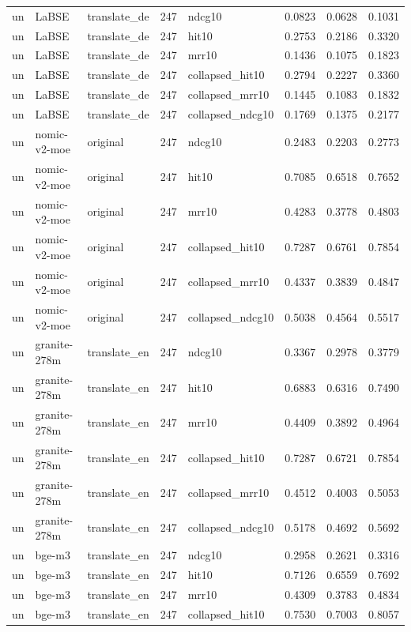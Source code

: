 \begin{tabular}{lllrlrrr}
un & LaBSE & translate\_de & 247 & ndcg10 & 0.0823 & 0.0628 & 0.1031 \\
un & LaBSE & translate\_de & 247 & hit10 & 0.2753 & 0.2186 & 0.3320 \\
un & LaBSE & translate\_de & 247 & mrr10 & 0.1436 & 0.1075 & 0.1823 \\
un & LaBSE & translate\_de & 247 & collapsed\_hit10 & 0.2794 & 0.2227 & 0.3360 \\
un & LaBSE & translate\_de & 247 & collapsed\_mrr10 & 0.1445 & 0.1083 & 0.1832 \\
un & LaBSE & translate\_de & 247 & collapsed\_ndcg10 & 0.1769 & 0.1375 & 0.2177 \\
un & nomic-v2-moe & original & 247 & ndcg10 & 0.2483 & 0.2203 & 0.2773 \\
un & nomic-v2-moe & original & 247 & hit10 & 0.7085 & 0.6518 & 0.7652 \\
un & nomic-v2-moe & original & 247 & mrr10 & 0.4283 & 0.3778 & 0.4803 \\
un & nomic-v2-moe & original & 247 & collapsed\_hit10 & 0.7287 & 0.6761 & 0.7854 \\
un & nomic-v2-moe & original & 247 & collapsed\_mrr10 & 0.4337 & 0.3839 & 0.4847 \\
un & nomic-v2-moe & original & 247 & collapsed\_ndcg10 & 0.5038 & 0.4564 & 0.5517 \\
un & granite-278m & translate\_en & 247 & ndcg10 & 0.3367 & 0.2978 & 0.3779 \\
un & granite-278m & translate\_en & 247 & hit10 & 0.6883 & 0.6316 & 0.7490 \\
un & granite-278m & translate\_en & 247 & mrr10 & 0.4409 & 0.3892 & 0.4964 \\
un & granite-278m & translate\_en & 247 & collapsed\_hit10 & 0.7287 & 0.6721 & 0.7854 \\
un & granite-278m & translate\_en & 247 & collapsed\_mrr10 & 0.4512 & 0.4003 & 0.5053 \\
un & granite-278m & translate\_en & 247 & collapsed\_ndcg10 & 0.5178 & 0.4692 & 0.5692 \\
un & bge-m3 & translate\_en & 247 & ndcg10 & 0.2958 & 0.2621 & 0.3316 \\
un & bge-m3 & translate\_en & 247 & hit10 & 0.7126 & 0.6559 & 0.7692 \\
un & bge-m3 & translate\_en & 247 & mrr10 & 0.4309 & 0.3783 & 0.4834 \\
un & bge-m3 & translate\_en & 247 & collapsed\_hit10 & 0.7530 & 0.7003 & 0.8057 \\

\end{tabular}
